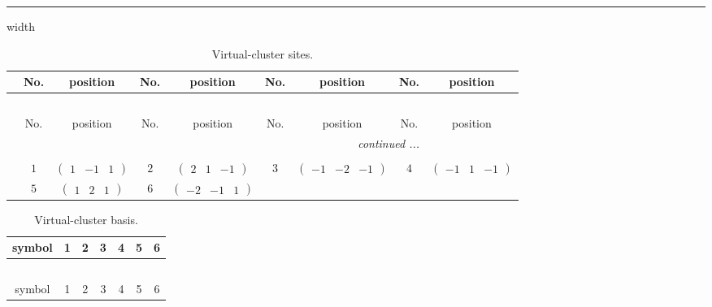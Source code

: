 \documentclass[fleqn,10pt,landscape]{article}
\begin{document}
\begin{itemize}
 \hfil \hrule height 1mm width \textwidth \hfil

{
\scriptsize
\begin{center}
\renewcommand{\arraystretch}{1.7}
\begin{longtable}{ccccccccc}
\caption{Virtual-cluster sites.}
 \\
 \hline \hline
 & No. & position & No. & position & No. & position & No. & position \\ \hline \endfirsthead

\multicolumn{8}{l}{\tablename\ \thetable{}} \\
 \hline \hline
 & No. & position & No. & position & No. & position & No. & position \\ \hline \endhead

 \hline \hline
\multicolumn{8}{r}{\footnotesize\it continued ...} \\ \endfoot

 \hline \hline
\multicolumn{8}{r}{} \\ \endlastfoot

 & $ 1 $ & $ \begin{pmatrix} 1 & -1 & 1 \end{pmatrix} $ & $ 2 $ & $ \begin{pmatrix} 2 & 1 & -1 \end{pmatrix} $ & $ 3 $ & $ \begin{pmatrix} -1 & -2 & -1 \end{pmatrix} $ & $ 4 $ & $ \begin{pmatrix} -1 & 1 & -1 \end{pmatrix} $ \\
& $ 5 $ & $ \begin{pmatrix} 1 & 2 & 1 \end{pmatrix} $ & $ 6 $ & $ \begin{pmatrix} -2 & -1 & 1 \end{pmatrix} $ & $  $ & $  $ & $  $ & $  $ \\
\end{longtable}
\end{center}
\begin{center}
\renewcommand{\arraystretch}{1.7}
\begin{longtable}{ccccccc}
\caption{Virtual-cluster basis.}
 \\
 \hline \hline
symbol & 1 & 2 & 3 & 4 & 5 & 6 \\ \hline \endfirsthead

\multicolumn{6}{l}{\tablename\ \thetable{}} \\
 \hline \hline
symbol & 1 & 2 & 3 & 4 & 5 & 6 \\ \hline \endhead


\end{longtable}
\end{center}}
\end{itemize}
\end{document}
